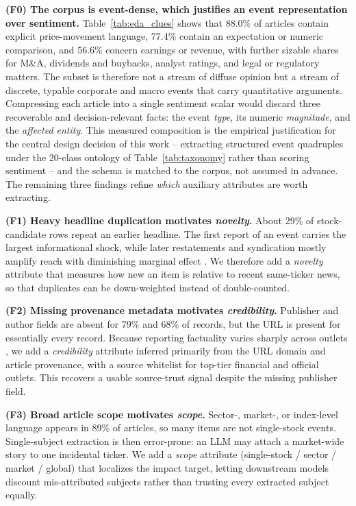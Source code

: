 \documentclass[sigconf,review]{acmart}
\begin{document}
\textbf{(F0) The corpus is event-dense, which justifies an event representation over sentiment.} Table~\ref{tab:eda_clues} shows that 88.0\% of articles contain explicit price-movement language, 77.4\% contain an expectation or numeric comparison, and 56.6\% concern earnings or revenue, with further sizable shares for M\&A, dividends and buybacks, analyst ratings, and legal or regulatory matters. The subset is therefore not a stream of diffuse opinion but a stream of discrete, typable corporate and macro events that carry quantitative arguments. Compressing each article into a single sentiment scalar would discard three recoverable and decision-relevant facts: the event \emph{type}, its numeric \emph{magnitude}, and the \emph{affected entity}. This measured composition is the empirical justification for the central design decision of this work -- extracting structured event quadruples under the 20-class ontology of Table~\ref{tab:taxonomy} rather than scoring sentiment -- and the schema is matched to the corpus, not assumed in advance. The remaining three findings refine \emph{which} auxiliary attributes are worth extracting.

\textbf{(F1) Heavy headline duplication motivates \emph{novelty}.} About 29\% of stock-candidate rows repeat an earlier headline. The first report of an event carries the largest informational shock, while later restatements and syndication mostly amplify reach with diminishing marginal effect \cite{sano2017novel}. We therefore add a \emph{novelty} attribute that measures how new an item is relative to recent same-ticker news, so that duplicates can be down-weighted instead of double-counted.

\textbf{(F2) Missing provenance metadata motivates \emph{credibility}.} Publisher and author fields are absent for 79\% and 68\% of records, but the URL is present for essentially every record. Because reporting factuality varies sharply across outlets \cite{baly2018predicting}, we add a \emph{credibility} attribute inferred primarily from the URL domain and article provenance, with a source whitelist for top-tier financial and official outlets. This recovers a usable source-trust signal despite the missing publisher field.

\textbf{(F3) Broad article scope motivates \emph{scope}.} Sector-, market-, or index-level language appears in 89\% of articles, so many items are not single-stock events. Single-subject extraction is then error-prone: an LLM may attach a market-wide story to one incidental ticker. We add a \emph{scope} attribute (single-stock / sector / market / global) that localizes the impact target, letting downstream models discount mis-attributed subjects rather than trusting every extracted subject equally.
\end{document}
